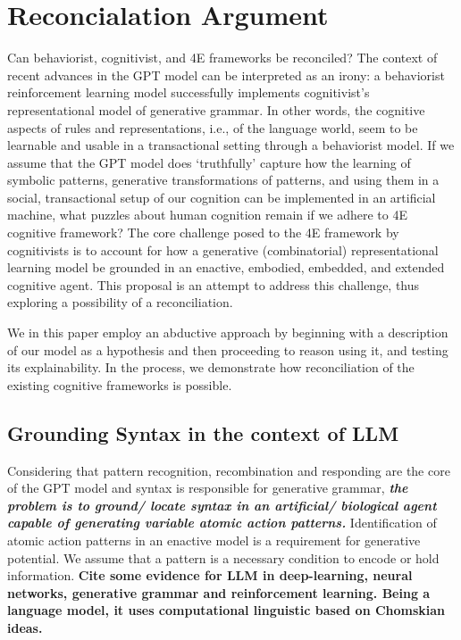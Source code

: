 \section{Reconcialation Argument}

Can behaviorist, cognitivist, and 4E frameworks be reconciled?
The context of recent advances in the GPT model can be interpreted as an irony: a behaviorist reinforcement learning model successfully implements cognitivist's representational model of generative grammar. In other words, the cognitive aspects of rules and representations, i.e., of the language world, seem to be learnable and usable in a transactional setting through a behaviorist model. If we assume that the GPT model does `truthfully' capture how the learning of symbolic patterns, generative transformations of patterns, and using them in a social, transactional setup of our cognition can be implemented in an artificial machine, what puzzles about human cognition remain if we adhere to 4E cognitive framework? The core challenge posed to the 4E framework by cognitivists is to account for how a generative (combinatorial) representational learning model be grounded in an enactive, embodied, embedded, and extended cognitive agent. This proposal is an attempt to address this challenge, thus exploring a possibility of a reconciliation.

We in this paper employ an abductive approach by beginning with a description of our model as a hypothesis and then proceeding to reason using it, and testing its explainability. In the process, we demonstrate how reconciliation of the existing cognitive frameworks is possible.

\subsection{Grounding Syntax in the context of LLM} Considering that pattern recognition, recombination and responding are the core of the GPT model and syntax is responsible for generative grammar, \textbf{\textit{the problem is to ground/ locate syntax in an artificial/ biological agent capable of generating variable atomic action patterns. }}Identification of atomic action patterns in an enactive model is a requirement for generative potential. We assume that a pattern is a necessary condition to encode or hold information. 
{\bf Cite some evidence for LLM in deep-learning, neural networks, generative grammar and reinforcement learning. Being a language model, it uses computational linguistic based on Chomskian ideas.}

